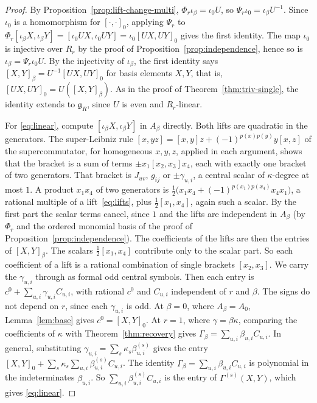 \documentclass[11pt]{article}
\numberwithin{equation}{section}
\theoremstyle{definition}
\theoremstyle{remark}
\begin{document}
\begin{proof}
By Proposition~\ref{prop:lift-change-multi}, $\Phi_r\iota_\beta=\iota_0U$, so
$\Psi_r\iota_0=\iota_\beta U^{-1}$. Since $\iota_0$ is a homomorphism for
$[\cdot,\cdot]_0$, applying $\Psi_r$ to
$\Phi_r[\iota_\beta X,\iota_\beta Y]=[\iota_0UX,\iota_0UY]=\iota_0[UX,UY]_0$ gives
the first identity. The map $\iota_0$ is injective over $R_r$ by the proof of
Proposition~\ref{prop:independence}, hence so is $\iota_\beta=\Psi_r\iota_0U$. By the injectivity of $\iota_\beta$,
the first identity says $[X,Y]_\beta=U^{-1}[UX,UY]_0$ for basis elements $X,Y$, that is,
$[UX,UY]_0=U([X,Y]_\beta)$. As in the proof of Theorem~\ref{thm:triv-single}, the identity extends
to $\mathfrak g_R$, since $U$ is even and $R_r$-linear.

For \eqref{eq:linear}, compute $[\iota_\beta X,\iota_\beta Y]$ in $A_\beta$ directly.
Both lifts are quadratic in the generators. The super-Leibniz rule
$[x,yz]=[x,y]z+(-1)^{p(x)p(y)}y[x,z]$ of the supercommutator, for homogeneous $x,y,z$, applied in each
argument, shows that the bracket is a sum of terms $\pm x_1[x_2,x_3]x_4$, each with exactly one bracket of two generators. That
bracket is $J_{uv}$, $g_{ij}$ or $\pm\gamma_{u,i}$, a central scalar of $\kappa$-degree
at most $1$. A product $x_1x_4$ of two generators is
$\tfrac12\bigl(x_1x_4+(-1)^{p(x_1)p(x_4)}x_4x_1\bigr)$, a rational multiple of a lift~\eqref{eq:lifts},
plus $\tfrac12[x_1,x_4]$, again such a scalar. By the first part the scalar terms cancel, since
$1$ and the lifts are independent in $A_\beta$ (by $\Phi_r$ and the ordered monomial
basis of the proof of Proposition~\ref{prop:independence}). The coefficients of the
lifts are then the entries of $[X,Y]_\beta$. The scalars $\tfrac12[x_1,x_4]$ contribute only to the scalar part. So each coefficient of a lift
is a rational combination of single brackets $[x_2,x_3]$. We carry the $\gamma_{u,i}$
through as formal odd central symbols. Then each entry is
$c^0+\sum_{u,i}\gamma_{u,i}C_{u,i}$, with rational $c^0$ and $C_{u,i}$ independent of $r$
and $\beta$. The signs do not depend on $r$, since each $\gamma_{u,i}$ is odd. At $\beta=0$, where $A_\beta=A_0$, Lemma~\ref{lem:base} gives
$c^0=[X,Y]_0$. At $r=1$, where $\gamma=\beta\kappa$, comparing the coefficients of $\kappa$ with
Theorem~\ref{thm:recovery} gives
$\Gamma_\beta=\sum_{u,i}\beta_{u,i}C_{u,i}$. In general, substituting
$\gamma_{u,i}=\sum_s\kappa_s\beta^{(s)}_{u,i}$ gives the entry $[X,Y]_0+\sum_s\kappa_s\sum_{u,i}\beta^{(s)}_{u,i}C_{u,i}$.
The identity $\Gamma_\beta=\sum_{u,i}\beta_{u,i}C_{u,i}$ is polynomial in the indeterminates $\beta_{u,i}$. So
$\sum_{u,i}\beta^{(s)}_{u,i}C_{u,i}$ is the entry of $\Gamma^{(s)}(X,Y)$, which gives \eqref{eq:linear}.
\end{proof}
\end{document}
